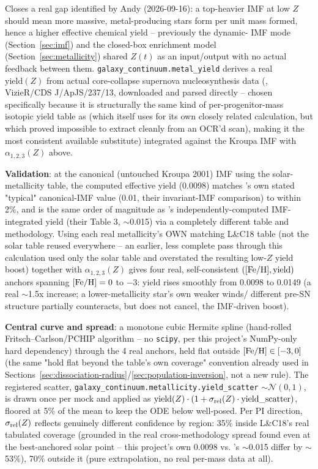 \documentclass{aastex7}
\begin{document}
Closes a real gap identified by Andy (2026-09-16): a top-heavier IMF at low
$Z$ should mean more massive, metal-producing stars form per unit mass
formed, hence a higher effective chemical yield -- previously the dynamic-
IMF mode (Section~\ref{sec:imf}) and the closed-box enrichment model
(Section~\ref{sec:metallicity}) shared $Z(t)$ as an input/output with no
actual feedback between them. \texttt{galaxy\_continuum.metal\_yield}
derives a real $\mathrm{yield}(Z)$ from actual core-collapse supernova
nucleosynthesis data (\citealt{LimongiChieffi2018}, VizieR/CDS
J/ApJS/237/13, downloaded and parsed directly -- chosen specifically
because it is structurally the same kind of per-progenitor-mass isotopic
yield table as \citet{WooseleyWeaver1995} (which \citealt{RecchiKroupa2015}
itself uses for its own closely related calculation, but which proved
impossible to extract cleanly from an OCR'd scan), making it the most
consistent available substitute) integrated against the Kroupa IMF with
$\alpha_{1,2,3}(Z)$ above.

\textbf{Validation}: at the canonical (untouched Kroupa 2001) IMF using the
solar-metallicity table, the computed effective yield (0.0098) matches
\citet{RecchiKroupa2015}'s own stated "typical" canonical-IMF value (0.01,
their invariant-IMF comparison) to within 2\%, and is the same order of
magnitude as \citet{KobayashiEtAl2020}'s independently-computed IMF-
integrated yield (their Table 3, $\sim$0.015) via a completely different
table and methodology. Using each real metallicity's OWN matching L\&C18
table (not the solar table reused everywhere -- an earlier, less complete
pass through this calculation used only the solar table and overstated the
resulting low-$Z$ yield boost) together with $\alpha_{1,2,3}(Z)$ gives four
real, self-consistent $([{\rm Fe/H}], \mathrm{yield})$ anchors spanning
$[{\rm Fe/H}]=0$ to $-3$: yield rises smoothly from 0.0098 to 0.0149 (a
real $\sim$1.5x increase; a lower-metallicity star's own weaker winds/
different pre-SN structure partially counteracts, but does not cancel, the
IMF-driven boost).

\textbf{Central curve and spread}: a monotone cubic Hermite spline
(hand-rolled Fritsch--Carlson/PCHIP algorithm -- no \texttt{scipy}, per this
project's NumPy-only hard dependency) through the 4 real anchors, held flat
outside $[{\rm Fe/H}]\in[-3,0]$ (the same "hold flat beyond the table's own
coverage" convention already used in
Sections~\ref{sec:dissociation-radius}/\ref{sec:population-inversion}, not
a new rule). The registered scatter,
\texttt{galaxy\_continuum.metallicity.yield\_scatter} $\sim
\mathcal{N}(0,1)$, is drawn once per mock and applied as
$\mathrm{yield}(Z)\cdot(1+\sigma_{\rm rel}(Z)\cdot\mathrm{yield\_scatter})$,
floored at 5\% of the mean to keep the ODE below well-posed. Per PI
direction, $\sigma_{\rm rel}(Z)$ reflects genuinely different confidence by
region: 35\% inside L\&C18's real tabulated coverage (grounded in the real
cross-methodology spread found even at the best-anchored solar point --
this project's own 0.0098 vs. \citeauthor{KobayashiEtAl2020}'s $\sim$0.015
differ by $\sim$53\%), 70\% outside it (pure extrapolation, no real
per-mass data at all).
\end{document}
